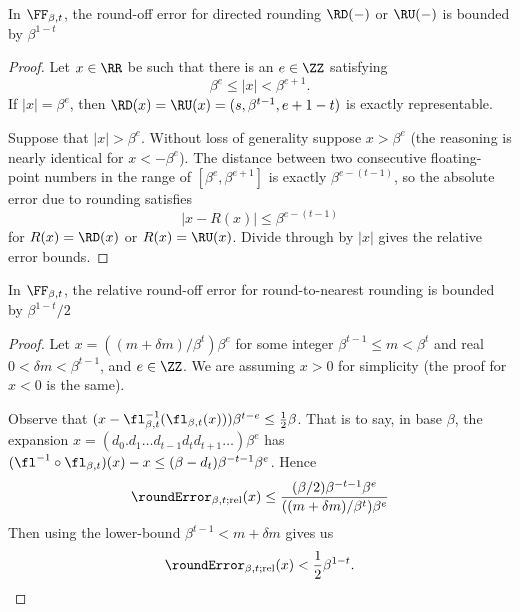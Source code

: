 \begin{lemma}\label{lemma:idealized:directed-round-off-error}
In $\FF_{\beta,t}$, the round-off error for directed rounding $\RD(-)$
or $\RU(-)$ is bounded by $\beta^{1-t}$
\end{lemma}
\begin{proof}
  Let $x\in\RR$ be such that there is an $e\in\ZZ$ satisfying
  \begin{equation}
    \beta^{e}\leq|x|<\beta^{e+1}.
  \end{equation}
  If $|x|=\beta^{e}$, then $\RD(x)=\RU(x)=(s,\beta^{t-1},e+1-t)$ is
  exactly representable.

  Suppose that $|x|>\beta^{e}$. Without loss of generality suppose
  $x>\beta^{e}$ (the reasoning is nearly identical for $x<-\beta^{e}$).
  The distance between two consecutive floating-point numbers in the
  range of $[\beta^{e},\beta^{e+1}]$ is exactly $\beta^{e-(t-1)}$, so
  the absolute error due to rounding satisfies
  \begin{equation}
    |x - R(x)|\leq\beta^{e-(t-1)}
  \end{equation}
  for $R(x)=\RD(x)$ or $R(x)=\RU(x)$. Divide through by $|x|$ gives the
  relative error bounds.
\end{proof}


\begin{lemma}\label{lemma:idealized:rn-round-off-error}
In $\FF_{\beta,t}$, the relative round-off error for round-to-nearest rounding is
bounded by $\beta^{1-t}/2$
\end{lemma}
\begin{proof}
Let $x=((m+\delta m)/\beta^{t})\beta^{e}$ for some integer $\beta^{t-1}\leq m<\beta^{t}$
and real $0<\delta m<\beta^{t-1}$, and $e\in\ZZ$. We are assuming $x>0$
for simplicity (the proof for $x<0$ is the same).

Observe that $(x - \fl^{-1}_{\beta,t}(\fl_{\beta,t}(x)))\beta^{t-e}\leq \frac{1}{2}\beta$.
That is to say, in base $\beta$, the expansion $x = (d_{0}.d_{1}\dots d_{t-1}d_{t}d_{t+1}\dots)\beta^{e}$
has $(\fl^{-1}\circ\fl_{\beta,t})(x) - x\leq (\beta -d_{t})\beta^{-t-1}\beta^{e}$. Hence
\begin{equation}
  \roundError_{\beta,t;\text{rel}}(x)\leq
  \frac{(\beta/2)\beta^{-t-1}\beta^{e}}{((m+\delta m)/\beta^{t})\beta^{e}}
\end{equation}
Then using the lower-bound $\beta^{t-1}< m+\delta m$ gives us
\begin{equation*}
  \roundError_{\beta,t;\text{rel}}(x) < \frac{1}{2}\beta^{1-t}.\qedhere
\end{equation*}
\end{proof}


